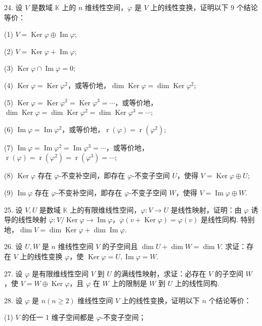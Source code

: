 \documentclass[UTF8, 12pt, fontset=fandol, oneside]{ctexart}
\begin{document}
24. 设 $V$ 是数域 $\mathbb{K}$ 上的 $n$ 维线性空间，$\varphi$ 是 $V$ 上的线性变换，证明以下 9 个结论等价：

(1) $V=\operatorname{Ker}\varphi\oplus\operatorname{Im}\varphi$;

(2) $V=\operatorname{Ker}\varphi+\operatorname{Im}\varphi$;

(3) $\operatorname{Ker}\varphi\cap\operatorname{Im}\varphi=0$;

(4) $\operatorname{Ker}\varphi=\operatorname{Ker}\varphi^2$，或等价地，$\dim\operatorname{Ker}\varphi=\dim\operatorname{Ker}\varphi^2$;

(5) $\operatorname{Ker}\varphi=\operatorname{Ker}\varphi^2=\operatorname{Ker}\varphi^3=\cdots$，或等价地，$\dim\operatorname{Ker}\varphi=\dim\operatorname{Ker}\varphi^2=\dim\operatorname{Ker}\varphi^3=\cdots$;

(6) $\operatorname{Im}\varphi=\operatorname{Im}\varphi^2$，或等价地，$\operatorname{r}(\varphi)=\operatorname{r}(\varphi^2)$;

(7) $\operatorname{Im}\varphi=\operatorname{Im}\varphi^2=\operatorname{Im}\varphi^3=\cdots$，或等价地，$\operatorname{r}(\varphi)=\operatorname{r}(\varphi^2)=\operatorname{r}(\varphi^3)=\cdots$;

(8) $\operatorname{Ker}\varphi$ 存在 $\varphi$-不变补空间，即存在 $\varphi$-不变子空间 $U$，使得 $V=\operatorname{Ker}\varphi\oplus U$;

(9) $\operatorname{Im}\varphi$ 存在 $\varphi$-不变补空间，即存在 $\varphi$-不变子空间 $W$，使得 $V=\operatorname{Im}\varphi\oplus W$.

25. 设 $V,U$ 是数域 $\mathbb{K}$ 上的有限维线性空间，$\varphi:V\to U$ 是线性映射，证明：由 $\varphi$ 诱导的线性映射 $\overline{\varphi}:V/\operatorname{Ker}\varphi\to\operatorname{Im}\varphi$，$\overline{\varphi}(v+\operatorname{Ker}\varphi)=\varphi(v)$ 是线性同构. 特别地，$\dim V=\dim\operatorname{Ker}\varphi+\dim\operatorname{Im}\varphi$.

26. 设 $U,W$ 是 $n$ 维线性空间 $V$ 的子空间且 $\dim U+\dim W=\dim V$. 求证：存在 $V$ 上的线性变换 $\varphi$，使 $\operatorname{Ker}\varphi=U,\operatorname{Im}\varphi=W$.

27. 设 $\varphi$ 是有限维线性空间 $V$ 到 $U$ 的满线性映射，求证：必存在 $V$ 的子空间 $W$，使 $V=W\oplus\operatorname{Ker}\varphi$，且 $\varphi$ 在 $W$ 上的限制是 $W$ 到 $U$ 上的线性同构.

28. 设 $\varphi$ 是 $n(n\geq 2)$ 维线性空间 $V$ 上的线性变换，证明以下 $n$ 个结论等价：

(1) $V$ 的任一 1 维子空间都是 $\varphi$-不变子空间；
\end{document}

